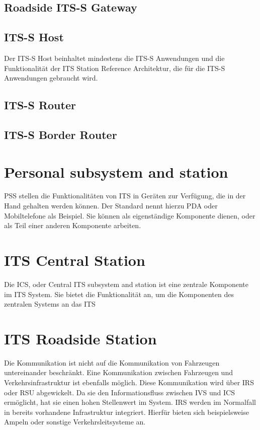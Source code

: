 \subsection{Roadside ITS-S Gateway}
\subsection{ITS-S Host}
Der ITS-S Host beinhaltet mindestens die ITS-S Anwendungen und die Funktionalität der ITS  Station Reference Architektur, die für die  ITS-S Anwendungen gebraucht wird. 


\subsection{ITS-S Router}
\subsection{ITS-S Border Router}

\section{Personal subsystem and station}
\ac{PSS} stellen die Funktionalitäten von \ac{ITS} in Geräten zur Verfügung, die in der Hand gehalten werden können. Der Standard nennt hierzu \ac{PDA} oder Mobiltelefone als Beispiel. Sie können als eigenständige Komponente dienen, oder als Teil einer anderen Komponente arbeiten.

\section{ITS Central Station}
Die \ac{ICS}, oder Central \ac{ITS} subsystem and station ist eine zentrale Komponente im \ac{ITS} System. Sie bietet die Funktionalität an, um die Komponenten des zentralen Systems an das \ac{ITS} 

\section{ITS Roadside Station}
Die Kommunikation ist nicht auf die Kommunikation von Fahrzeugen untereinander beschränkt. Eine Kommunikation zwischen Fahrzeugen und Verkehrsinfrastruktur ist ebenfalls möglich. Diese Kommunikation wird über \ac{IRS} oder \ac{RSU} abgewickelt. Da sie den Informationsfluss zwischen \ac{IVS} und \ac{ICS} ermöglicht, hat sie einen hohen Stellenwert im System. \ac{IRS} werden im Normalfall in bereits vorhandene Infrastruktur integriert. Hierfür bieten sich beispielsweise Ampeln oder sonstige Verkehrsleitsysteme an. 

